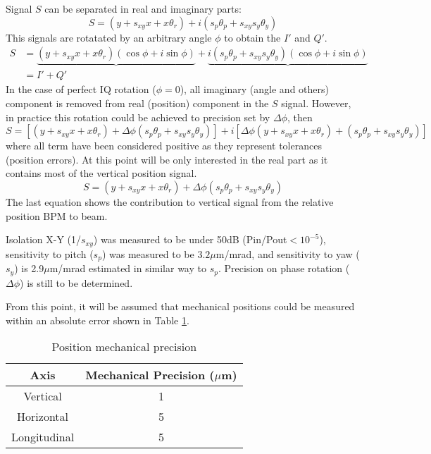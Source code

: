 Signal $S$ can be separated in real and imaginary parts:
\begin{equation}
S = (y+s_{xy}x+x\theta_r)+i(s_p\theta_p+s_{xy}s_y\theta_y)
\end{equation}
This signals are rotatated by an arbitrary angle $\phi$ to obtain the $I'$ and $Q'$.
\begin{align*}
S &= \underbrace{(y+s_{xy}x+x\theta_r)(\cos\phi+i\sin\phi)}+\underbrace{i(s_p\theta_p+s_{xy}s_y\theta_y)(\cos\phi+i\sin\phi)}\\
  &= I' + Q' 
\end{align*}
In the case of perfect IQ rotation ($\phi=0$), all imaginary (angle and others) component is removed from real (position) component in the $S$ signal. However, in practice this rotation could be achieved to precision set by $\Delta\phi$, then
\begin{equation}
 S = [(y+s_{xy}x+x\theta_r)+\Delta\phi(s_p\theta_p+s_{xy}s_y\theta_y)]+i[\Delta\phi(y+s_{xy}x+x\theta_r)+(s_p\theta_p+s_{xy}s_y\theta_y)]
\end{equation}
where all term have been considered positive as they represent tolerances (position errors). At this point will be only interested in the real part as it contains most of the vertical position signal.
\begin{equation}
 S = (y+s_{xy}x+x\theta_r)+\Delta\phi(s_p\theta_p+s_{xy}s_y\theta_y)
\end{equation}
The last equation shows the contribution to vertical signal from the relative position BPM to beam.\par
Isolation X-Y (1/$s_{xy}$) was measured to be under 50dB (Pin/Pout$<10^{-5}$), sensitivity to pitch ($s_p$) was measured to be $3.2\mu$m/mrad, and sensitivity to yaw ($s_y$) is 2.9$\mu$m/mrad estimated in similar way to $s_p$. Precision on phase rotation ($\Delta\phi$) is still to be determined.\par
From this point, it will be assumed that mechanical positions could be measured within an absolute error shown in Table \ref{mechprec}.\par
\begin{table}[htb]
\begin{center}
 \begin{tabular}{|c|c|}\hline
  Axis & Mechanical Precision ($\mu$m)\\\hline
  Vertical & 1\\
  Horizontal & 5\\
  Longitudinal & 5 \\\hline
 \end{tabular}\caption{Position mechanical precision}\label{mechprec}
 \end{center}
\end{table}
